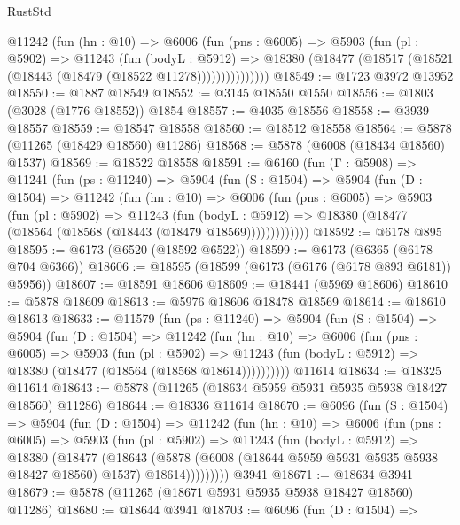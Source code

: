 \begin{lexlean}{RustStd}
\begin{coremodule}
            @11242
              (fun (hn : @10) =>
              @6006
                (fun (pns : @6005) =>
                @5903
                  (fun (pl : @5902) =>
                  @11243
                    (fun (bodyL : @5912) =>
                    @18380 (@18477 (@18517 (@18521 (@18443 (@18479 (@18522 @11278)))))))))))))))
@18549 := @1723 @3972 @13952
@18550 := @1887 @18549
@18552 := @3145 @18550 @1550
@18556 := @1803 (@3028 (@1776 @18552)) @1854
@18557 := @4035 @18556
@18558 := @3939 @18557
@18559 := @18547 @18558
@18560 := @18512 @18558
@18564 := @5878 (@11265 (@18429 @18560) @11286)
@18568 := @5878 (@6008 (@18434 @18560) @1537)
@18569 := @18522 @18558
@18591 := @6160
    (fun (Γ : @5908) =>
    @11241
      (fun (ps : @11240) =>
      @5904
        (fun (S : @1504) =>
        @5904
          (fun (D : @1504) =>
          @11242
            (fun (hn : @10) =>
            @6006
              (fun (pns : @6005) =>
              @5903
                (fun (pl : @5902) =>
                @11243
                  (fun (bodyL : @5912) =>
                  @18380 (@18477 (@18564 (@18568 (@18443 (@18479 @18569)))))))))))))
@18592 := @6178 @895
@18595 := @6173 (@6520 (@18592 @6522))
@18599 := @6173 (@6365 (@6178 @704 @6366))
@18606 := @18595 (@18599 (@6173 (@6176 (@6178 @893 @6181)) @5956))
@18607 := @18591 @18606
@18609 := @18441 (@5969 @18606)
@18610 := @5878 @18609
@18613 := @5976 @18606 @18478 @18569
@18614 := @18610 @18613
@18633 := @11579
    (fun (ps : @11240) =>
    @5904
      (fun (S : @1504) =>
      @5904
        (fun (D : @1504) =>
        @11242
          (fun (hn : @10) =>
          @6006
            (fun (pns : @6005) =>
            @5903
              (fun (pl : @5902) =>
              @11243 (fun (bodyL : @5912) => @18380 (@18477 (@18564 (@18568 @18614))))))))))
    @11614
@18634 := @18325 @11614
@18643 := @5878 (@11265 (@18634 @5959 @5931 @5935 @5938 @18427 @18560) @11286)
@18644 := @18336 @11614
@18670 := @6096
    (fun (S : @1504) =>
    @5904
      (fun (D : @1504) =>
      @11242
        (fun (hn : @10) =>
        @6006
          (fun (pns : @6005) =>
          @5903
            (fun (pl : @5902) =>
            @11243
              (fun (bodyL : @5912) =>
              @18380
                (@18477
                  (@18643
                    (@5878
                      (@6008 (@18644 @5959 @5931 @5935 @5938 @18427 @18560) @1537)
                      @18614)))))))))
    @3941
@18671 := @18634 @3941
@18679 := @5878 (@11265 (@18671 @5931 @5935 @5938 @18427 @18560) @11286)
@18680 := @18644 @3941
@18703 := @6096
    (fun (D : @1504) =>

\end{coremodule}
\end{lexlean}
